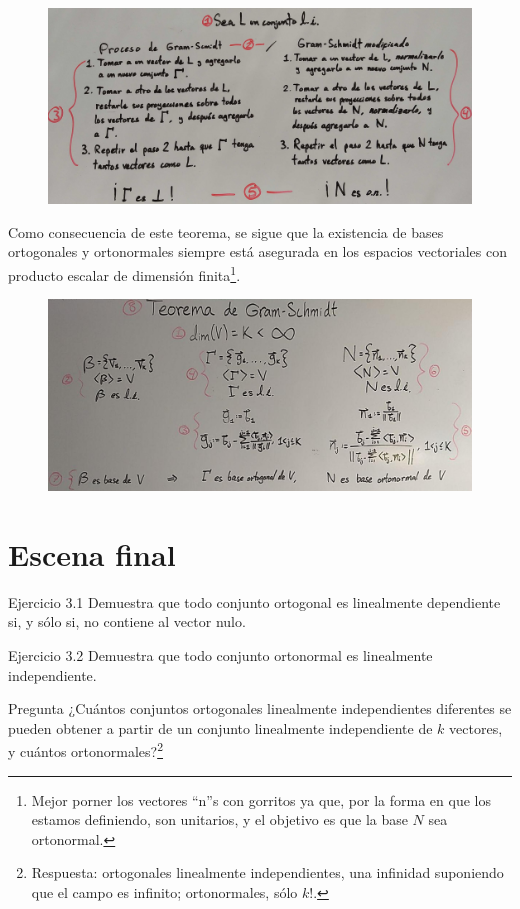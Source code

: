 \documentclass[12pt,dvipsnames]{article}
\numberwithin{equation}{section}
\begin{document}
\begin{figure}[h!]
    \centering
    \includegraphics[width=16cm]{3-1.png}
\end{figure}

Como consecuencia de este teorema, se sigue que la existencia de bases ortogonales y ortonormales siempre está asegurada en los espacios vectoriales con producto escalar de dimensión finita\footnote{Mejor porner los vectores ``n''s con gorritos ya que, por la forma en que los estamos definiendo, son unitarios, y el objetivo es que la base $N$ sea ortonormal.}.

\begin{figure}[h!]
    \centering
    \includegraphics[width=16cm]{3-2.png}
\end{figure}



\newpage
\section{Escena final}

Ejercicio 3.1 Demuestra que todo conjunto ortogonal es linealmente dependiente si, y sólo si, no contiene al vector nulo.

Ejercicio 3.2 Demuestra que todo conjunto ortonormal es linealmente independiente.

Pregunta ¿Cuántos conjuntos ortogonales linealmente independientes diferentes se pueden obtener a partir de un conjunto linealmente independiente de $k$ vectores, y cuántos ortonormales?\footnote{Respuesta: ortogonales linealmente independientes, una infinidad \textemdash suponiendo que el campo es infinito; ortonormales, sólo $k!$.} 
\end{document}
